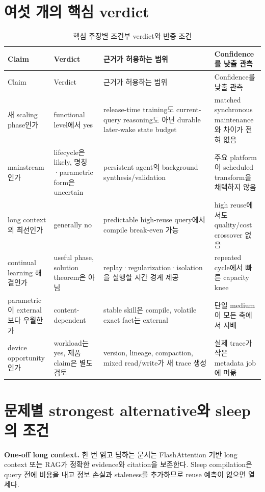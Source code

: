 \section{여섯 개의 핵심 verdict}

\begin{longtable}{L{0.16\textwidth} L{0.19\textwidth} L{0.28\textwidth} L{0.22\textwidth}}
\caption{핵심 주장별 조건부 verdict와 반증 조건}\label{tab:promisingness-verdicts}\\
\toprule
Claim & Verdict & 근거가 허용하는 범위 & Confidence를 낮출 관측 \\
\midrule
\endfirsthead
\toprule
Claim & Verdict & 근거가 허용하는 범위 & Confidence를 낮출 관측 \\
\midrule
\endhead
새 scaling phase인가 & functional level에서 yes & release-time training도 current-query reasoning도 아닌 durable later-wake state budget & matched synchronous maintenance와 차이가 전혀 없음 \\
mainstream인가 & lifecycle은 likely, 명칭·parametric form은 uncertain & persistent agent의 background synthesis/validation & 주요 platform이 scheduled transform을 채택하지 않음 \\
long context의 최선인가 & generally no & predictable high-reuse query에서 compile break-even 가능 & high reuse에서도 quality/cost crossover 없음 \\
continual learning 해결인가 & useful phase, solution theorem은 아님 & replay·regularization·isolation을 실행할 시간 경계 제공 & repeated cycle에서 빠른 capacity knee \\
parametric이 external보다 우월한가 & content-dependent & stable skill은 compile, volatile exact fact는 external & 단일 medium이 모든 축에서 지배 \\
device opportunity인가 & workload는 yes, 제품 claim은 별도 검토 & version, lineage, compaction, mixed read/write가 새 trace 생성 & 실제 trace가 작은 metadata job에 머묾 \\
\bottomrule
\end{longtable}

\section{문제별 strongest alternative와 sleep의 조건}

\textbf{One-off long context.} 한 번 읽고 답하는 문서는 FlashAttention 기반 long context 또는 RAG가
정확한 evidence와 citation을 보존한다. Sleep compilation은 query 전에 비용을 내고 정보 손실과
staleness를 추가하므로 reuse 예측이 없으면 열세다.

